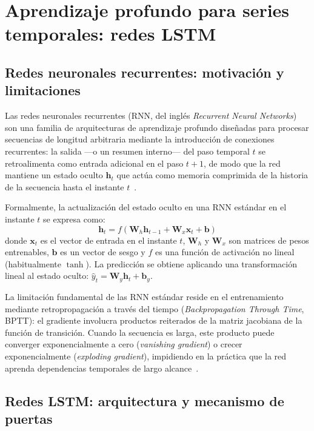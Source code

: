 \section{Aprendizaje profundo para series temporales: redes LSTM}
\label{sec:deep_learning_lstm}

\subsection{Redes neuronales recurrentes: motivación y limitaciones}
\label{subsec:rnn_motivacion}

Las redes neuronales recurrentes (RNN, del inglés \emph{Recurrent Neural Networks}) son una familia de arquitecturas de aprendizaje profundo diseñadas para procesar secuencias de longitud arbitraria mediante la introducción de conexiones recurrentes: la salida —o un resumen interno— del paso temporal $t$ se retroalimenta como entrada adicional en el paso $t+1$, de modo que la red mantiene un estado oculto $\mathbf{h}_t$ que actúa como memoria comprimida de la historia de la secuencia hasta el instante $t$~\cite{rumelhart1986learning}.

Formalmente, la actualización del estado oculto en una RNN estándar en el instante $t$ se expresa como:
\begin{equation}
    \mathbf{h}_t = f\!\left(\mathbf{W}_h \mathbf{h}_{t-1} + \mathbf{W}_x \mathbf{x}_t + \mathbf{b}\right)
\end{equation}
donde $\mathbf{x}_t$ es el vector de entrada en el instante $t$, $\mathbf{W}_h$ y $\mathbf{W}_x$ son matrices de pesos entrenables, $\mathbf{b}$ es un vector de sesgo y $f$ es una función de activación no lineal (habitualmente $\tanh$). La predicción se obtiene aplicando una transformación lineal al estado oculto: $\hat{y}_t = \mathbf{W}_y \mathbf{h}_t + \mathbf{b}_y$.

La limitación fundamental de las RNN estándar reside en el entrenamiento mediante retropropagación a través del tiempo (\emph{Backpropagation Through Time}, BPTT): el gradiente involucra productos reiterados de la matriz jacobiana de la función de transición. Cuando la secuencia es larga, este producto puede converger exponencialmente a cero (\emph{vanishing gradient}) o crecer exponencialmente (\emph{exploding gradient}), impidiendo en la práctica que la red aprenda dependencias temporales de largo alcance~\cite{bengio1994learning,hochreiter1997long}.

\subsection{Redes LSTM: arquitectura y mecanismo de puertas}
\label{subsec:lstm_arquitectura}

